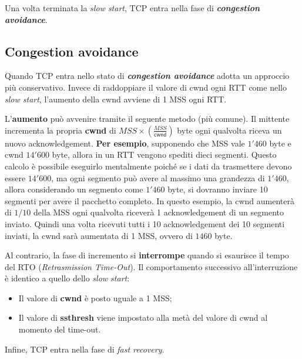 \documentclass[a4paper]{article}
\begin{document}
	\noindent
	Una volta terminata la \emph{slow start}, TCP entra nella fase di \textbf{\emph{congestion avoidance}}.\newpage
	
	\subsection{Congestion avoidance}
	
	Quando TCP entra nello stato di \textcolor{Red3}{\textbf{\emph{congestion avoidance}}} adotta un approccio più conservativo. Invece di raddoppiare il valore di \textsf{cwnd} ogni RTT come nello \emph{slow start}, l’aumento della \textsf{cwnd} avviene di 1 MSS ogni RTT.\newline
	
	\noindent
	L'\textbf{aumento} può avvenire tramite il seguente metodo (più comune).\newline
	Il mittente incrementa la propria \textbf{cwnd} di $MSS \times \left(\frac{MSS}{\textsf{cwnd}}\right)$ byte ogni qualvolta riceva un nuovo acknowledgement.\newline
	\textcolor{Green4}{\textbf{Per esempio}}, supponendo che MSS vale $1'460$ byte e \textsf{cwnd} $14'600$ byte, allora in un RTT vengono spediti dieci segmenti. Questo calcolo è possibile eseguirlo mentalmente poiché se i dati da trasmettere devono essere $14'600$, ma ogni segmento può avere al massimo una grandezza di $1'460$, allora considerando un segmento come $1'460$ byte, si dovranno inviare 10 segmenti per avere il pacchetto completo.\newline
	In questo esempio, la \textsf{cwnd} aumenterà di $1/10$ della MSS ogni qualvolta riceverà 1 acknowledgement di un segmento inviato. Quindi una volta ricevuti tutti i 10 acknowledgement dei 10 segmenti inviati, la \textsf{cwnd} sarà aumentata di 1 MSS, ovvero di $1460$ byte.\newline
	
	\noindent
	Al contrario, la fase di incremento si \textbf{interrompe} quando si esaurisce il tempo del RTO (\emph{Retrasmission Time-Out}). Il comportamento successivo all’interruzione è identico a quello dello \emph{slow start}:
	\begin{itemize}
		\item Il valore di \textsf{\textbf{cwnd}} è posto uguale a 1 MSS;
		\item Il valore di \textsf{\textbf{ssthresh}} viene impostato alla metà del valore di \textsf{cwnd} al momento del time-out.
	\end{itemize}
	Infine, TCP entra nella fase di \emph{fast recovery}.
	
\end{document}
